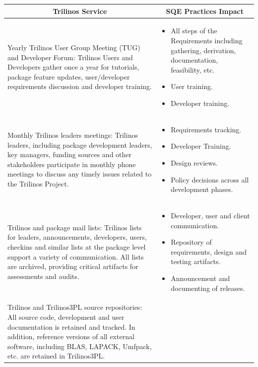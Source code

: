 \documentclass[12pt,relax]{TPA}
\begin{document}
\begin{table}
\begin{center}
\begin{tabular}{|p{1.75in}|p{2.75in}|}\hline
\multicolumn{1}{|c|}{Trilinos Service} &
\multicolumn{1}{|c|}{SQE Practices Impact}\\\hline
Yearly Trilinos User Group Meeting (TUG) and Developer Forum: Trilinos Users
and Developers gather once a year for tutorials, package feature updates,
user/developer requirements discussion and developer training. &  
\begin{itemize}
\item All steps of the Requirements including gathering, derivation,
documentation, feasibility, etc. 
\item User training.
\item Developer training.
\end{itemize} \\\hline
Monthly Trilinos leaders meetings: Trilinos leaders, including package
development leaders, key managers, funding sources and other
stakeholders participate in monthly phone meetings to discuss any
timely issues related to the Trilinos Project. &
\begin{itemize}
\item Requirements tracking.
\item Developer Training.
\item Design reviews.
\item Policy decisions across all development phases.
\end{itemize}\\\hline 
Trilinos and package mail lists:  Trilinos lists for leaders,
announcements, developers, users, checkins and similar lists at the package level
support a variety of communication.  All lists are archived, providing
critical artifacts for assessments and audits. &
\begin{itemize}
\item Developer, user and client communication.
\item Repository of requirements, design and testing artifacts.
\item Announcement and documenting of releases.
\end{itemize}\\\hline
Trilinos and Trilinos3PL source repositories:  All source code,
development and user documentation is retained
and tracked. In addition,  reference versions of all external
software, including BLAS, 
LAPACK, Umfpack, etc. are retained in Trilinos3PL.&

\end{tabular}
\end{center}
\end{table}
\end{document}
